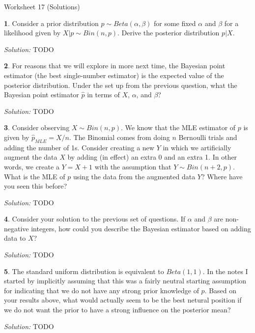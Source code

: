 \documentclass{tufte-handout}
\begin{document}
\justify

{\LARGE Worksheet 17 (Solutions)}

\vspace*{18pt}


\textbf{1}. Consider a prior distribution $p \sim Beta(\alpha, \beta)$ for some fixed
$\alpha$ and $\beta$ for a likelihood given by $X|p \sim Bin(n, p)$. Derive
the posterior distribution $p|X$.

\textit{Solution:} TODO

\textbf{2}. For reasons that we will explore in more next time, the Bayesian point estimator
(the best single-number estimator) is the expected value of the posterior
distribution. Under the set up from the previous question, what the Bayesian
point estimator $\widehat{p}$ in terms of $X$, $\alpha$, and $\beta$?

\textit{Solution:} TODO

\textbf{3}. Consider observing $X \sim Bin(n, p)$. We know that the MLE estimator of $p$ is
given by $\hat{p}_{MLE} = X / n$. The Binomial comes from doing $n$ Bernoulli
trials and adding the number of 1s. Consider creating a new $Y$ in which we 
artificially augment the data $X$ by adding (in effect) an extra 0 and an extra
1. In other words, we create a $Y = X + 1$ with the assumption that
$Y \sim Bin(n+2, p)$. What is the MLE of $p$ using the data from the augmented
data $Y$? Where have you seen this before?

\textit{Solution:} TODO

\textbf{4}. Consider your solution to the previous set of questions. If $\alpha$ and $\beta$
are non-negative integers, how could you describe the Bayesian estimator based
on adding data to $X$? 

\textit{Solution:} TODO

\textbf{5}. The standard uniform distribution is equivalent to $Beta(1,1)$. In the notes
I started by implicitly assuming that this was a fairly neutral starting
assumption for indicating that we do not have any strong prior knowledge of
$p$. Based on your results above, what would actually seem to be the best
netural position if we do not want the prior to have a strong influence on 
the posterior mean?

\textit{Solution:} TODO
\end{document}
